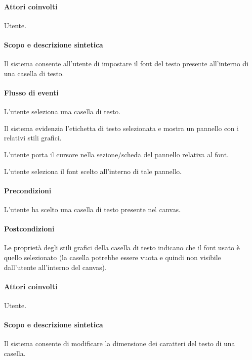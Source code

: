 \paragraph{Attori coinvolti} Utente.
\paragraph{Scopo e descrizione sintetica} 
Il sistema consente all'utente di impostare il font del testo presente all'interno di una casella di testo.
\paragraph{Flusso di eventi}
\begin{elenconumerato}[\textbf{}]{\subsubsecindent}
\item L'utente seleziona una casella di testo.
\item Il sistema evidenzia l'etichetta di testo selezionata e mostra un pannello con i relativi stili grafici.
\item L'utente porta il cursore nella sezione/scheda del pannello relativa al font.
\item L'utente seleziona il font scelto all'interno di tale pannello.
\end{elenconumerato}
\paragraph{Precondizioni} L'utente ha scelto una casella di testo presente nel canvas.
\paragraph{Postcondizioni} Le propriet\` a degli stili grafici della casella di testo indicano che il font usato \` e quello selezionato (la casella potrebbe essere vuota e quindi non visibile dall'utente all'interno del canvas).

\paragraph{Attori coinvolti} Utente.
\paragraph{Scopo e descrizione sintetica} 
Il sistema consente di modificare la dimensione dei caratteri del testo di una casella.
